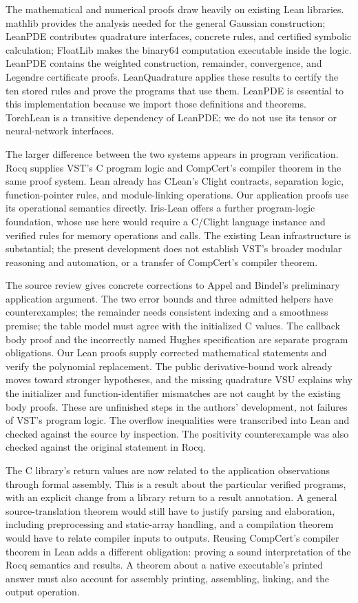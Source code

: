 \documentclass[11pt]{article}
\begin{document}
The mathematical and numerical proofs draw heavily on existing Lean
libraries. mathlib provides the analysis needed for the general Gaussian
construction; LeanPDE contributes quadrature interfaces, concrete rules,
and certified symbolic calculation; FloatLib makes the binary64
computation executable inside the logic. LeanPDE contains the weighted
construction, remainder, convergence, and Legendre certificate proofs.
LeanQuadrature applies these results to certify the ten stored rules and
prove the programs that use them.
LeanPDE is essential to this implementation because we import those
definitions and theorems.
TorchLean is a transitive dependency of LeanPDE; we do not use its tensor
or neural-network interfaces.

The larger difference between the two systems appears in program
verification. Rocq supplies VST's C program logic and CompCert's compiler
theorem in the same proof system. Lean already has CLean's Clight contracts,
separation logic, function-pointer rules, and module-linking operations.
Our application proofs use its operational semantics directly.
Iris-Lean offers a further program-logic foundation, whose use here would
require a C/Clight language instance and verified rules for memory operations
and calls. The existing Lean infrastructure is substantial; the present
development does not establish VST's broader modular reasoning and automation,
or a transfer of CompCert's compiler theorem.

The source review gives concrete corrections to Appel and Bindel's
preliminary application argument. The two error bounds and three admitted helpers have
counterexamples; the remainder needs consistent indexing and a smoothness
premise; the table model must agree with the initialized C values.
The callback body proof and the incorrectly named Hughes specification
are separate program obligations. Our Lean proofs supply corrected
mathematical statements and verify the polynomial replacement. The public
derivative-bound work already moves toward stronger hypotheses, and the
missing quadrature VSU explains why the initializer and function-identifier
mismatches are not caught by the existing body proofs. These are unfinished
steps in the authors' development, not failures of VST's program logic.
The overflow
inequalities were transcribed into Lean and checked against the source by
inspection. The positivity counterexample was also checked against the
original statement in Rocq.

The C library's return values are now related to the application observations
through formal assembly. This is a result about the particular verified
programs, with an explicit change from a library return to a result annotation.
A general source-translation theorem would still have to justify parsing and
elaboration, including preprocessing and static-array handling, and a
compilation theorem would have to relate compiler inputs to outputs. Reusing
CompCert's compiler theorem in Lean adds a different obligation: proving a
sound interpretation of the Rocq semantics and results. A theorem about a
native executable's printed answer must also account for assembly
printing, assembling, linking, and the output operation.
\end{document}
